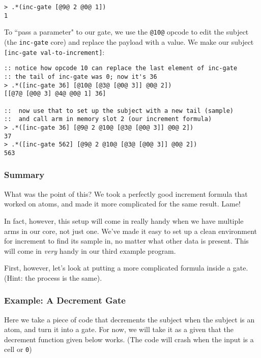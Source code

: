 \documentclass[twoside]{article}
\begin{document}
\begin{lstlisting}[style=listingcode]
> .*(inc-gate [@9@ 2 @0@ 1])
1
\end{lstlisting}

To ``pass a parameter" to our gate, we use the \lstinline[style=inlinecode]{@10@} opcode to edit the subject (the \lstinline[style=inlinecode]{inc-gate} core) and replace the payload with a value.  We make our subject \lstinline[style=inlinecode]{[inc-gate val-to-increment]}:

\begin{lstlisting}[style=listingcode]
:: notice how opcode 10 can replace the last element of inc-gate
:: the tail of inc-gate was 0; now it's 36
> .*([inc-gate 36] [@10@ [@3@ [@0@ 3]] @0@ 2])
[[@7@ [@0@ 3] @4@ @0@ 1] 36]

::  now use that to set up the subject with a new tail (sample)
::  and call arm in memory slot 2 (our increment formula)
> .*([inc-gate 36] [@9@ 2 @10@ [@3@ [@0@ 3]] @0@ 2])
37
> .*([inc-gate 562] [@9@ 2 @10@ [@3@ [@0@ 3]] @0@ 2])
563
\end{lstlisting}

\subsubsection{Summary}

What was the point of this? We took a perfectly good increment formula that worked on atoms, and made it more complicated for the same result. Lame!

In fact, however, this setup will come in really handy when we have multiple arms in our core, not just one. We've made it easy to set up a clean environment for increment to find its sample in, no matter what other data is present. This will come in \emph{very} handy in our third example program.

First, however, let's look at putting a more complicated formula inside a gate. (Hint: the process is the same).

\subsubsection{Example:  A Decrement Gate}

Here we take a piece of code that decrements the subject when the subject is an atom, and turn it into a gate.  For now, we will take it as a given that the decrement function given below works. (The code will crash when the input is a cell or \lstinline[style=inlinecode]{0})
\end{document}
